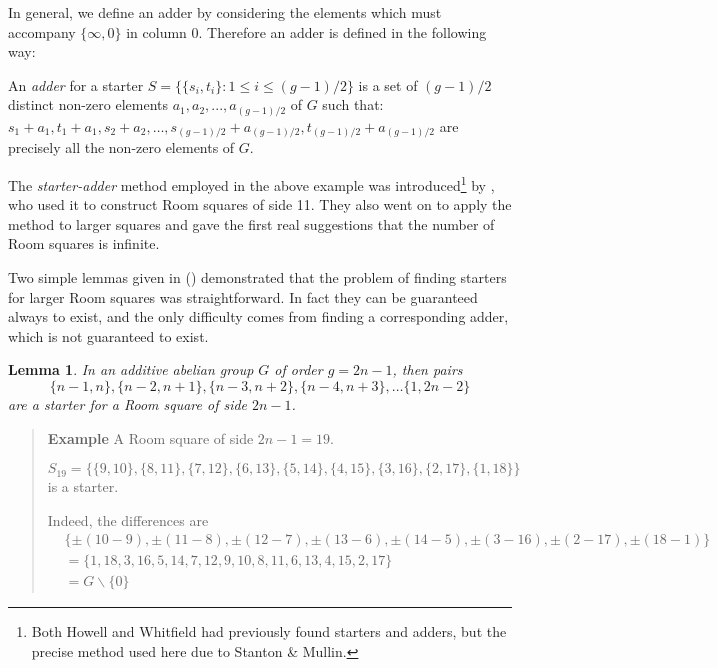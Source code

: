 \documentclass[
  11pt,
  a4paper]{book}
\newtheorem{lemma}[theorem]{Lemma}
\newcounter{examplecounter}
\begin{document}
In general, we define an adder by considering the elements
which must accompany \(\{\infty, 0\}\) in column 0. Therefore
an adder is defined in the following way:

An \emph{adder} for a starter
\(S = \{\{s_i, t_i\}: 1 \leq i \leq (g - 1)/2 \}\)
is a set of \((g - 1)/2\) distinct non-zero elements
\(a_1, a_2, ..., a_{(g - 1)/2}\) of \(G\) such that:
\(s_1 + a_1, t_1 + a_1, s_2 + a_2, \ldots, s_{(g - 1)/2} + a_{(g - 1)/2}, t_{(g - 1)/2} + a_{(g - 1)/2}\)
are precisely all the non-zero elements of \(G\).

The \emph{starter-adder} method employed in the above example was
introduced\footnote{Both Howell and Whitfield had previously found starters and
  adders, but the precise method used here due to Stanton \& Mullin.} by \textcite{stanton_construction_1968},
who used it to construct Room squares of side 11.
They also went on to apply the method to larger squares and
gave the first real suggestions that the number of Room squares
is infinite.

Two simple lemmas given in (\textcite{stanton_construction_1968})
demonstrated that the problem of finding starters for larger
Room squares was straightforward. In fact they can be
guaranteed always to exist, and the only difficulty comes
from finding a corresponding adder, which is not guaranteed
to exist.

\begin{lemma}
In an additive abelian group $G$ of order $g = 2n-1$,
then pairs
\begin{equation*}
  \{n - 1, n\}, \{n - 2, n + 1\}, \{n - 3, n + 2\}, \{n - 4, n + 3\}, \ldots\{1, 2n - 2\}
\end{equation*}
are a starter for a Room square of side $2n - 1$.
\end{lemma}

\begin{quote}  \textbf{Example } \quad 
A Room square of side $2n - 1 = 19$.

\begin{equation*}
S_{19} = \{\{9, 10\}, \{8, 11\}, \{7, 12\}, \{6, 13\}, \{5, 14\}, \{4, 15\}, \{3, 16\}, \{2, 17\}, \{1, 18\}\}
\end{equation*}
is a starter.

Indeed, the differences are
\begin{equation*}
\begin{split}
  & \{\pm(10 - 9), \pm(11 - 8), \pm(12 - 7), \pm(13 - 6), \pm(14 - 5), \pm(3 - 16), \pm(2 - 17), \pm(18 - 1)\} \\ 
  &= \{1, 18, 3, 16, 5, 14, 7, 12, 9, 10, 8, 11, 6, 13, 4, 15, 2, 17\} \\
  &= G \backslash \{0\}
\end{split}
\end{equation*}
 \end{quote}
\end{document}
